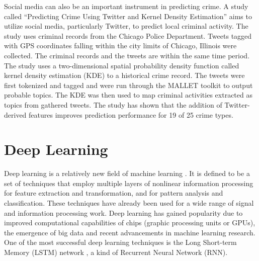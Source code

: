     Social media can also be an important instrument in predicting crime. A study called “Predicting Crime Using Twitter and Kernel Density Estimation” \citep{gerber2014predicting} aims to utilize social media, particularly Twitter, to predict local criminal activity. The study uses criminal records from the Chicago Police Department. Tweets tagged with GPS coordinates falling within the city limits of Chicago, Illinois were collected. The criminal records and the tweets are within the same time period. The study uses a two-dimensional spatial probability density function called kernel density estimation (KDE) to a historical crime record. The tweets were first tokenized and tagged and were run through the MALLET toolkit to output probable topics. The KDE was then used to map criminal activities extracted as topics from gathered tweets. The study has shown that the addition of Twitter-derived features improves prediction performance for 19 of 25 crime types.

\section{Deep Learning}
    Deep learning is a relatively new field of machine learning \citep{deng2014deep}. It is defined to be a set of techniques that employ multiple layers of nonlinear information processing for feature extraction and transformation, and for pattern analysis and classification. These techniques have already been used for a wide range of signal and information processing work. Deep learning has gained popularity due to improved computational capabilities of chips (graphic processing units or GPUs), the emergence of big data and recent advancements in machine learning research. One of the most successful deep learning techniques is the Long Short-term Memory (LSTM) network \citep{schmidhuber2015deep}, a kind of Recurrent Neural Network (RNN).

